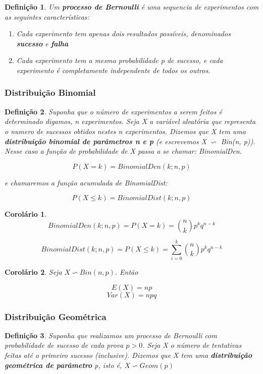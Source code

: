\documentclass[12pt]{article}
\newtheorem{corollary}{Corolário}[theorem]
\newtheorem{definition}{Definição}
\begin{document}
\begin{definition}
    Um \textbf{processo de Bernoulli} é uma sequencia de experimentos com as seguintes características:
    
    \begin{enumerate}
        \item Cada experimento tem apenas dois resultados possíveis, denominados \textbf{sucesso} e \textbf{falha}
        
        \item Cada experimento tem a mesma probabilidade p de sucesso, e cada experimento é completamente independente de todos os outros.
    \end{enumerate}
\end{definition}

\subsubsection*{Distribuição Binomial}

\begin{definition}
    Suponha que o número de experimentos a serem feitos é determinado digamos, n experimentos. Seja X a variável aleatória que representa o numero de sucessos obtidos nestes n experimentos. Dizemos que X tem uma \textbf{distribuição binomial de parâmetros n e p} (e escrevemos X $\backsim$ Bin(n, p)). Nesse caso a função de probabilidade de X passa a se chamar: BinomialDen.
    
    $$P(X = k) = BinomialDen (k; n, p)$$
    
    e chamaremos a função acumulada de BinomialDist:
    
    $$P(X \leq k) = BinomialDist (k; n, p)$$
\end{definition}

\begin{corollary}
    $$BinomialDen (k;n, p) = P(X = k) = {n \choose k} p^k q^{n-k}$$
    
    $$BinomialDist (k;n, p) = P(X \leq k) = \sum_{i = 0}^k {n \choose k} p^k q^{n - k}$$
\end{corollary}

\begin{corollary}
    Seja $X \backsim Bin (n, p)$. Então
    
    $$E(X) = n p$$
    $$Var (X) = n p q$$
\end{corollary}

\subsubsection*{Distribuição Geométrica}
\begin{definition}
    Suponha que realizamos um processo de Bernoulli com probabilidade de sucesso de cada prova $p > 0$. Seja X o número de tentativas feitas até o primeiro sucesso (inclusive). Dizemos que X tem uma \textbf{distribuição geométrica de parâmetro} p, isto é, $X \backsim Geom (p)$
\end{definition}
\end{document}
